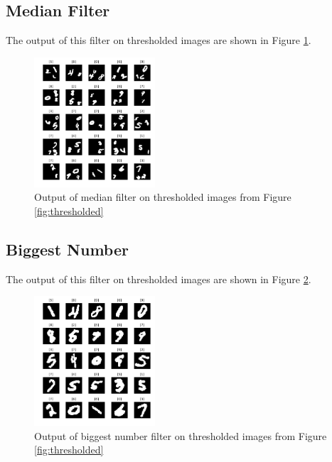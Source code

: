 \documentclass[letterpaper, 10 pt, conference]{ieeeconf}  %
\begin{document}
\subsection{Median Filter}
The output of this filter on thresholded images are shown in Figure \ref{fig:thresholdmed}.
\begin{figure}
	\begin{center}
		\includegraphics[width=0.4\textwidth]{figures/thresholdmedDataset.pdf}  %
		\caption{Output of median filter on thresholded images from Figure \ref{fig:thresholded}}
		\label{fig:thresholdmed}
	\end{center}
\end{figure}
\subsection{Biggest Number}
The output of this filter on thresholded images are shown in Figure \ref{fig:biggest}.
\begin{figure}
	\begin{center}
		\includegraphics[width=0.4\textwidth]{figures/biggestDataset.pdf}  %
		\caption{Output of biggest number filter on thresholded images from Figure \ref{fig:thresholded}}
		\label{fig:biggest}
	\end{center}
\end{figure}
\end{document}

